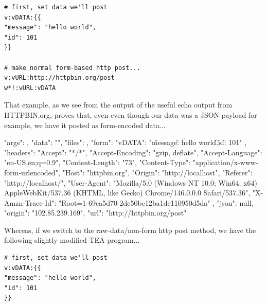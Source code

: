 \documentclass[a4paper, 18pt]{book} %
\begin{document}
{{{  \vspace{2em}

  \begin{tcolorbox}[teaterminalstyle, title=W: EXAMPLE 6: A Simple HTTP POST - using normal Form-based POSTING, breakable]
  \begin{lstlisting}[language=TEA,breaklines=true,]
# first, set data we'll post
v:vDATA:{{
"message": "hello world",
"id": 101
}}

# make normal form-based http post...
v:vURL:http://httpbin.org/post
w*!:vURL:vDATA
   \end{lstlisting}
  \end{tcolorbox}

\vspace{1em}


That example, as we see from the output of the useful echo output from HTTPBIN.org, proves that, even even though our data was a JSON payload for example, we have it posted as form-encoded data...


 \vspace{2em}
 \begin{tcbverbatim}[title=Sample OUTPUT 6 from EXAMPLE 6]
{
  "args": {}, 
  "data": "", 
  "files": {}, 
  "form": {
    "vDATA": "{\n\"message\": \"hello world\",\n\"id\": 101\n}"
  }, 
  "headers": {
    "Accept": "*/*", 
    "Accept-Encoding": "gzip, deflate", 
    "Accept-Language": "en-US,en;q=0.9", 
    "Content-Length": "73", 
    "Content-Type": "application/x-www-form-urlencoded", 
    "Host": "httpbin.org", 
    "Origin": "http://localhost", 
    "Referer": "http://localhost/", 
    "User-Agent": "Mozilla/5.0 (Windows NT 10.0; Win64; x64) AppleWebKit/537.36 (KHTML, like Gecko) Chrome/146.0.0.0 Safari/537.36", 
    "X-Amzn-Trace-Id": "Root=1-69ca5d70-2dc50bc12ba1de110950d5da"
  }, 
  "json": null, 
  "origin": "102.85.239.169", 
  "url": "http://httpbin.org/post"
}
  \end{tcbverbatim}
 \vspace{2em} 


Whereas, if we switch to the raw-data/non-form http post method, we have the following slightly modified TEA program...



  \vspace{2em}

  \begin{tcolorbox}[teaterminalstyle, title=W: EXAMPLE 7: A Simple HTTP POST - using non-Form-based POSTING, breakable]
  \begin{lstlisting}[language=TEA,breaklines=true,]
# first, set data we'll post
v:vDATA:{{
"message": "hello world",
"id": 101
}}


\end{lstlisting}
\end{tcolorbox}}}}
\end{document}
